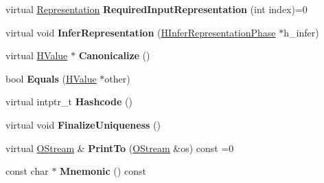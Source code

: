 \begin{DoxyCompactItemize}
\item 
\hypertarget{classv8_1_1internal_1_1_h_value_aa6dd667b98d1a58fccbabe464cfd108e}{}virtual \hyperlink{classv8_1_1internal_1_1_representation}{Representation} {\bfseries Required\+Input\+Representation} (int index)=0\label{classv8_1_1internal_1_1_h_value_aa6dd667b98d1a58fccbabe464cfd108e}

\item 
\hypertarget{classv8_1_1internal_1_1_h_value_a23d1ce318079ac9964ef49cecc88640b}{}virtual void {\bfseries Infer\+Representation} (\hyperlink{classv8_1_1internal_1_1_h_infer_representation_phase}{H\+Infer\+Representation\+Phase} $\ast$h\+\_\+infer)\label{classv8_1_1internal_1_1_h_value_a23d1ce318079ac9964ef49cecc88640b}

\item 
\hypertarget{classv8_1_1internal_1_1_h_value_abe96699770827e0dc2404e954357630c}{}virtual \hyperlink{classv8_1_1internal_1_1_h_value}{H\+Value} $\ast$ {\bfseries Canonicalize} ()\label{classv8_1_1internal_1_1_h_value_abe96699770827e0dc2404e954357630c}

\item 
\hypertarget{classv8_1_1internal_1_1_h_value_a0daf995c06fb2c5d68db5f9c3830831a}{}bool {\bfseries Equals} (\hyperlink{classv8_1_1internal_1_1_h_value}{H\+Value} $\ast$other)\label{classv8_1_1internal_1_1_h_value_a0daf995c06fb2c5d68db5f9c3830831a}

\item 
\hypertarget{classv8_1_1internal_1_1_h_value_aaaddf433f006258ad1d88ed80a2066b1}{}virtual intptr\+\_\+t {\bfseries Hashcode} ()\label{classv8_1_1internal_1_1_h_value_aaaddf433f006258ad1d88ed80a2066b1}

\item 
\hypertarget{classv8_1_1internal_1_1_h_value_a678c14133c345e29116e35212da724da}{}virtual void {\bfseries Finalize\+Uniqueness} ()\label{classv8_1_1internal_1_1_h_value_a678c14133c345e29116e35212da724da}

\item 
\hypertarget{classv8_1_1internal_1_1_h_value_ab94c6b7653ec20e4a8b5096c77e99ddc}{}virtual \hyperlink{classv8_1_1internal_1_1_o_stream}{O\+Stream} \& {\bfseries Print\+To} (\hyperlink{classv8_1_1internal_1_1_o_stream}{O\+Stream} \&os) const =0\label{classv8_1_1internal_1_1_h_value_ab94c6b7653ec20e4a8b5096c77e99ddc}

\item 
\hypertarget{classv8_1_1internal_1_1_h_value_a4169d73d5ed7bb3398b34616ca2ac437}{}const char $\ast$ {\bfseries Mnemonic} () const \label{classv8_1_1internal_1_1_h_value_a4169d73d5ed7bb3398b34616ca2ac437}


\end{DoxyCompactItemize}
